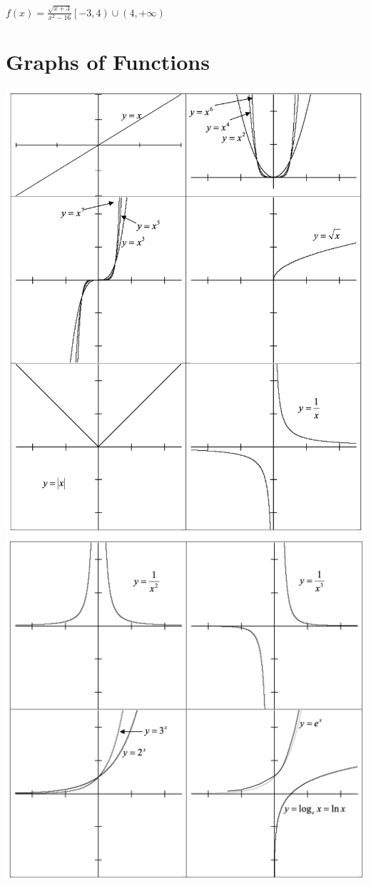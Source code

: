 \problemans%
{$\displaystyle f\left(x\right)=\frac{\sqrt{x + 3}}{x^2-16}$}{$\displaystyle \left[-3, 4\right) \cup \left(4, +\infty\right)$}



\section{Graphs of Functions}

\includegraphics[width=0.7\linewidth]{chapter1/function1}\\
\includegraphics[width=0.7\linewidth]{chapter1/function2}



